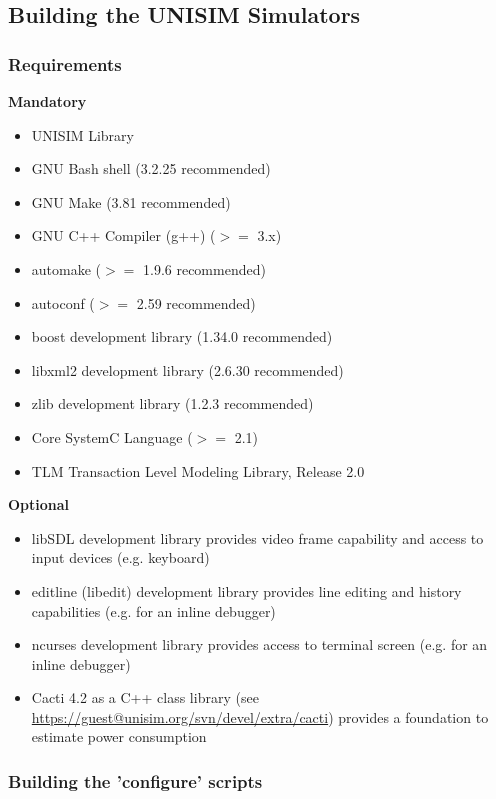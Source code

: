 \subsection{Building the UNISIM Simulators}

\subsubsection{Requirements}

\noindent \textbf{Mandatory}

\begin{itemize}
\item UNISIM Library
\item GNU Bash shell (3.2.25 recommended)
\item GNU Make (3.81 recommended)
\item GNU C++ Compiler (g++) ($>=$ 3.x)
\item automake ($>=$ 1.9.6 recommended)
\item autoconf ($>=$ 2.59 recommended)
\item boost development library (1.34.0 recommended)
\item libxml2 development library (2.6.30 recommended)
\item zlib development library (1.2.3 recommended)
\item Core SystemC Language ($>=$ 2.1)
\item TLM Transaction Level Modeling Library, Release 2.0
\end{itemize}

\noindent \textbf{Optional}

\begin{itemize}
\item libSDL development library provides video frame capability and access to input devices (e.g. keyboard)
\item editline (libedit) development library provides line editing and history capabilities (e.g. for an inline debugger)
\item ncurses development library provides access to terminal screen (e.g. for an inline debugger)
\item Cacti 4.2 as a C++ class library (see \url{https://guest@unisim.org/svn/devel/extra/cacti}) provides a foundation to estimate power consumption
\end{itemize}

\subsubsection{Building the 'configure' scripts}

